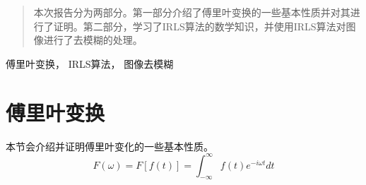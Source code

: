 \documentclass[journal]{IEEEtran}
\begin{document}







\maketitle

\begin{abstract}
本次报告分为两部分。第一部分介绍了傅里叶变换的一些基本性质并对其进行了证明。第二部分，学习了IRLS算法的数学知识，并使用IRLS算法对图像进行了去模糊的处理。
\end{abstract}

\begin{IEEEkeywords}
傅里叶变换， IRLS算法， 图像去模糊
\end{IEEEkeywords}






%
\IEEEpeerreviewmaketitle



\section{傅里叶变换}
% 
% 
% 
% 
本节会介绍并证明傅里叶变化的一些基本性质。 
\begin{equation}
	F(\omega) = F[f(t)] = \int_{-\infty}^{\infty}f(t)e^{-i \omega t}dt
\end{equation}
\end{document}
